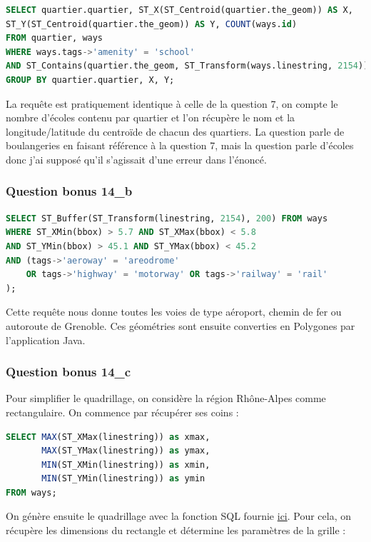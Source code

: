 \documentclass[12pt,a4paper]{article}
\begin{document}
\begin{lstlisting}[language=SQL]
SELECT quartier.quartier, ST_X(ST_Centroid(quartier.the_geom)) AS X, 
ST_Y(ST_Centroid(quartier.the_geom)) AS Y, COUNT(ways.id) 
FROM quartier, ways
WHERE ways.tags->'amenity' = 'school'
AND ST_Contains(quartier.the_geom, ST_Transform(ways.linestring, 2154))
GROUP BY quartier.quartier, X, Y;
\end{lstlisting}

La requête est pratiquement identique à celle de la question 7, on compte le nombre d'écoles contenu par quartier et l'on récupère le nom et la longitude/latitude du centroïde de chacun des quartiers.
La question parle de boulangeries en faisant référence à la question 7, mais la question parle d'écoles donc j'ai supposé qu'il s'agissait d'une erreur dans l'énoncé.


\subsubsection*{Question bonus 14\_b}

\begin{lstlisting}[language=SQL]
SELECT ST_Buffer(ST_Transform(linestring, 2154), 200) FROM ways
WHERE ST_XMin(bbox) > 5.7 AND ST_XMax(bbox) < 5.8
AND ST_YMin(bbox) > 45.1 AND ST_YMax(bbox) < 45.2
AND (tags->'aeroway' = 'areodrome'
	OR tags->'highway' = 'motorway' OR tags->'railway' = 'rail'
);
\end{lstlisting}

Cette requête nous donne toutes les voies de type aéroport, chemin de fer ou autoroute de Grenoble. Ces géométries sont ensuite converties en Polygones par l'application Java.

\subsubsection*{Question bonus 14\_c}

Pour simplifier le quadrillage, on considère la région Rhône-Alpes comme rectangulaire.
On commence par récupérer ses coins :

\begin{lstlisting}[language=SQL]
SELECT MAX(ST_XMax(linestring)) as xmax,
       MAX(ST_YMax(linestring)) as ymax,
       MIN(ST_XMin(linestring)) as xmin,
       MIN(ST_YMin(linestring)) as ymin
FROM ways;
\end{lstlisting}

On génère ensuite le quadrillage avec la fonction SQL fournie \href{https://gis.stackexchange.com/a/16390}{ici}.
Pour cela, on récupère les dimensions du rectangle et détermine les paramètres
de la grille :
\end{document}
